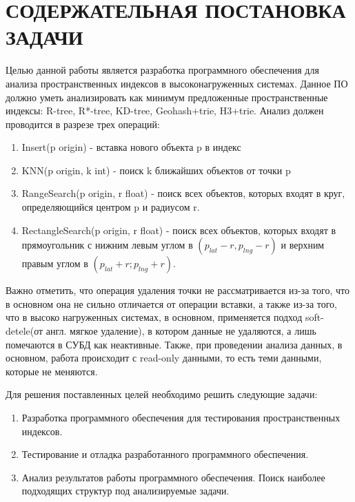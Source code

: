 \chapter{СОДЕРЖАТЕЛЬНАЯ ПОСТАНОВКА ЗАДАЧИ}
\label{cha:statement}

Целью данной работы является разработка программного обеспечения для анализа пространственных индексов в высоконагруженных системах. Данное ПО должно уметь анализировать как минимум предложенные пространственные индексы: R-tree, R*-tree, KD-tree, Geohash+trie, H3+trie. Анализ должен проводится в разрезе трех операций:
\begin{enumerate}
    \item  Insert(p origin) - вставка нового объекта p в индекс
    \item  KNN(p origin, k int) - поиск k ближайших объектов от точки p
    \item  RangeSearch(p origin, r float) - поиск всех объектов, которых входят в круг, определяющийся центром p и радиусом r.
    \item  RectangleSearch(p origin, r float) - поиск всех объектов, которых входят в прямоугольник с нижним левым углом в $(p_{lat} - r, p_{lng} - r)$ и верхним правым углом в  $(p_{lat} + r; p_{lng} + r)$.
\end{enumerate}

Важно отметить, что операция удаления точки не рассматривается из-за того, что в основном она не сильно отличается от операции вставки, а также из-за того, что в высоко нагруженных системах, в основном, применяется подход soft-detele(от англ. мягкое удаление), в котором данные не удаляются, а лишь помечаются в СУБД как неактивные. Также, при проведении анализа данных, в основном, работа происходит с read-only данными, то есть теми данными, которые не меняются.

Для решения поставленных целей необходимо решить следующие задачи:
\begin{enumerate}
    \item  Разработка программного обеспечения для тестирования пространственных индексов.
    \item  Тестирование и отладка разработанного программного обеспечения.
    \item  Анализ результатов работы программного обеспечения. Поиск наиболее подходящих структур под анализируемые задачи.
\end{enumerate}
